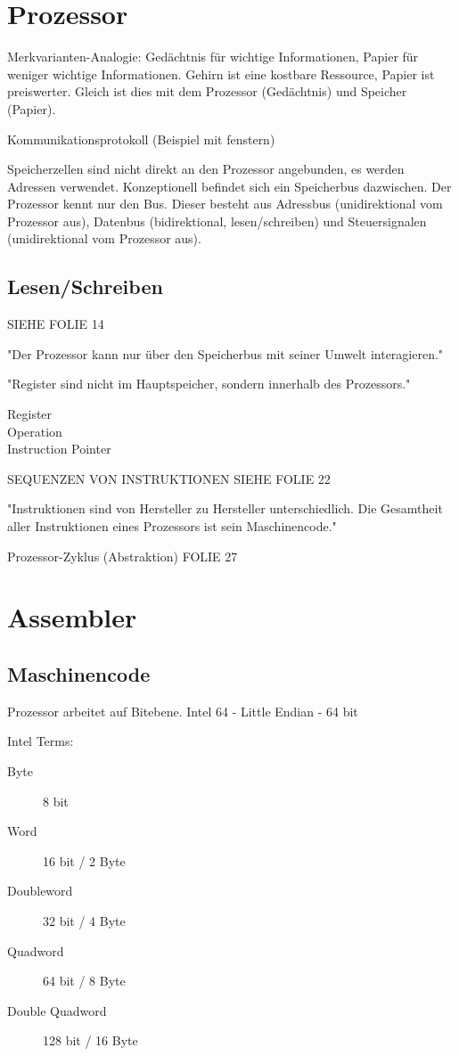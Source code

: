 \begin{multicols*}{4}
\section{Prozessor}
Merkvarianten-Analogie: Gedächtnis für wichtige Informationen, Papier für weniger wichtige Informationen. Gehirn ist eine kostbare Ressource, Papier ist preiswerter. Gleich ist dies mit dem Prozessor (Gedächtnis) und Speicher (Papier).

Kommunikationsprotokoll (Beispiel mit fenstern)

Speicherzellen sind nicht direkt an den Prozessor angebunden, es werden Adressen verwendet. Konzeptionell befindet sich ein Speicherbus dazwischen. Der Prozessor kennt nur den Bus. Dieser besteht aus Adressbus (unidirektional vom Prozessor aus), Datenbus (bidirektional, lesen/schreiben) und Steuersignalen (unidirektional vom Prozessor aus).

\subsection{Lesen/Schreiben}
SIEHE FOLIE 14

"Der Prozessor kann nur über den Speicherbus mit seiner Umwelt interagieren."

"Register sind nicht im Hauptspeicher, sondern innerhalb des Prozessors."

\begin{description}
    \item[Register]
    \item[Operation]
    \item[Instruction Pointer]
\end{description}

SEQUENZEN VON INSTRUKTIONEN SIEHE FOLIE 22

"Instruktionen sind von Hersteller zu Hersteller unterschiedlich. Die Gesamtheit aller Instruktionen eines Prozessors ist sein Maschinencode."

Prozessor-Zyklus (Abstraktion) FOLIE 27

    \section{Assembler}
    \subsection{Maschinencode}
    Prozessor arbeitet auf Bitebene. Intel 64 - Little Endian - 64 bit

    Intel Terms:
    \begin{description}
        \item[Byte] 8 bit
        \item[Word] 16 bit / 2 Byte
        \item[Doubleword] 32 bit / 4 Byte
        \item[Quadword] 64 bit / 8 Byte
        \item[Double Quadword] 128 bit / 16 Byte
    \end{description}


\end{multicols*}
